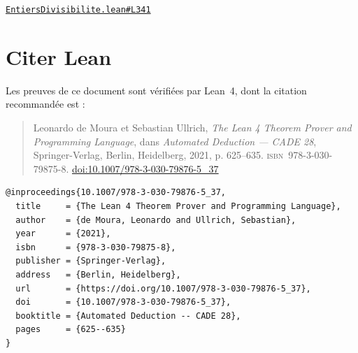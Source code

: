 \documentclass[11pt,a4paper]{article}
\theoremstyle{definition}
\theoremstyle{plain}
\newcommand{\source}[2]{\par\smallskip\noindent\hfill{\footnotesize\href{#1}{\texttt{#2}}}\par\smallskip}
\begin{document}
\source{https://github.com/Commutator-IO/learn-lean/blob/main/cours/01-college/01-nombres-et-calculs/EntiersDivisibilite.lean\#L341}{EntiersDivisibilite.lean\#L341}

\section*{Citer Lean}

Les preuves de ce document sont vérifiées par Lean~4, dont la citation recommandée est :

\begin{quote}
Leonardo de Moura et Sebastian Ullrich, \emph{The Lean 4 Theorem Prover and Programming
Language}, dans \emph{Automated Deduction — CADE 28}, Springer-Verlag, Berlin, Heidelberg,
2021, p. 625--635. \textsc{isbn}~978-3-030-79875-8.
\href{https://doi.org/10.1007/978-3-030-79876-5_37}{doi:10.1007/978-3-030-79876-5\_37}
\end{quote}

\begin{footnotesize}
\begin{verbatim}
@inproceedings{10.1007/978-3-030-79876-5_37,
  title     = {The Lean 4 Theorem Prover and Programming Language},
  author    = {de Moura, Leonardo and Ullrich, Sebastian},
  year      = {2021},
  isbn      = {978-3-030-79875-8},
  publisher = {Springer-Verlag},
  address   = {Berlin, Heidelberg},
  url       = {https://doi.org/10.1007/978-3-030-79876-5_37},
  doi       = {10.1007/978-3-030-79876-5_37},
  booktitle = {Automated Deduction -- CADE 28},
  pages     = {625--635}
}
\end{verbatim}
\end{footnotesize}
\end{document}
